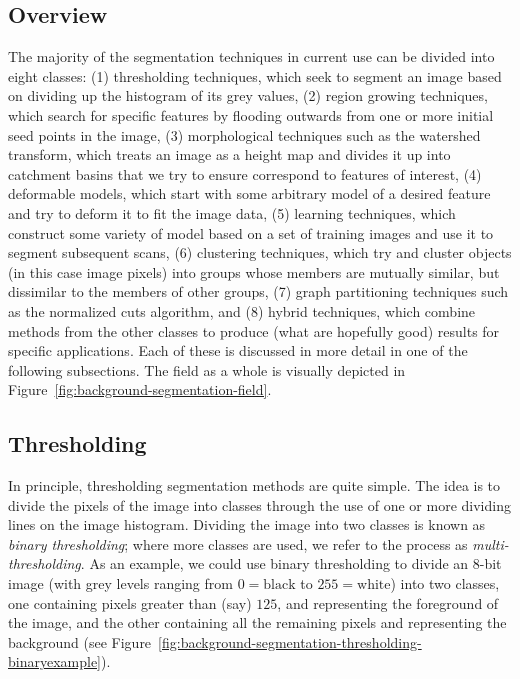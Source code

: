 \subsection{Overview}

The majority of the segmentation techniques in current use can be divided into eight classes: (1) thresholding techniques, which seek to segment an image based on dividing up the histogram of its grey values, (2) region growing techniques, which search for specific features by flooding outwards from one or more initial seed points in the image, (3) morphological techniques such as the watershed transform, which treats an image as a height map and divides it up into catchment basins that we try to ensure correspond to features of interest, (4) deformable models, which start with some arbitrary model of a desired feature and try to deform it to fit the image data, (5) learning techniques, which construct some variety of model based on a set of training images and use it to segment subsequent scans, (6) clustering techniques, which try and cluster objects (in this case image pixels) into groups whose members are mutually similar, but dissimilar to the members of other groups, (7) graph partitioning techniques such as the normalized cuts algorithm, and (8) hybrid techniques, which combine methods from the other classes to produce (what are hopefully good) results for specific applications. Each of these is discussed in more detail in one of the following subsections. The field as a whole is visually depicted in Figure~\ref{fig:background-segmentation-field}.


\subsection{Thresholding}

In principle, thresholding segmentation methods are quite simple. The idea is to divide the pixels of the image into classes through the use of one or more dividing lines on the image histogram. Dividing the image into two classes is known as \emph{binary thresholding}; where more classes are used, we refer to the process as \emph{multi-thresholding}. As an example, we could use binary thresholding to divide an 8-bit image (with grey levels ranging from $0 = \mbox{black}$ to $255 = \mbox{white}$) into two classes, one containing pixels greater than (say) $125$, and representing the foreground of the image, and the other containing all the remaining pixels and representing the background (see Figure~\ref{fig:background-segmentation-thresholding-binaryexample}).

